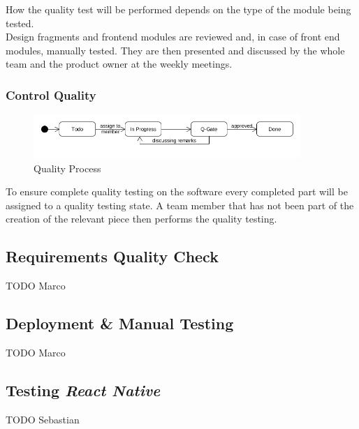 How the quality test will be performed depends on the type of the module being tested.\\
Design fragments and frontend modules are reviewed and, in case of front end modules, manually tested. They are then presented and discussed by the whole team and the product owner at the weekly meetings.\\

\subsubsection{Control Quality}

\begin{figure}[H]
    \begin{center}
        \includegraphics[width=0.9\textwidth]{images/state-quality.png}
        \caption{Quality Process}
        \label{fig:quality_process}
    \end{center}
\end{figure}

To ensure complete quality testing on the software every completed part will be assigned to a quality testing state. A team member that has not been part of the creation of the relevant piece then performs the quality testing.

\subsection{Requirements Quality Check}
\label{ssec:requirements_quality_check}

TODO Marco

\subsection{Deployment \& Manual Testing}
\label{ssec:deployment_manual_testing}

TODO Marco

\subsection{Testing \textit{React Native}}
\label{ssec:testing_react_native}

TODO Sebastian